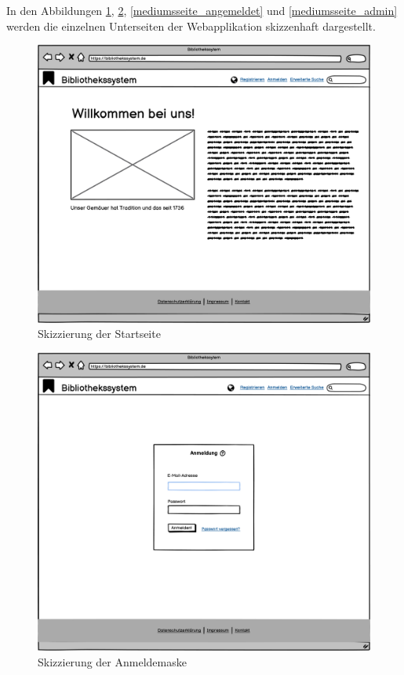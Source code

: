 \documentclass{article}
\begin{document}
In den Abbildungen \ref{startseite}, \ref{anmeldemaske}, \ref{mediumsseite_angemeldet} und \ref{mediumsseite_admin} werden die einzelnen Unterseiten der Webapplikation skizzenhaft dargestellt.

\begin{figure}[h]
    \includegraphics[width = 40em]{Startseite}
    \caption{Skizzierung der Startseite}
    \label{startseite}
\end{figure}

\begin{figure}[h]
    \includegraphics[width = 40em]{Anmeldemaske}
    \caption{Skizzierung der Anmeldemaske}
    \label{anmeldemaske}
\end{figure}
\end{document}

